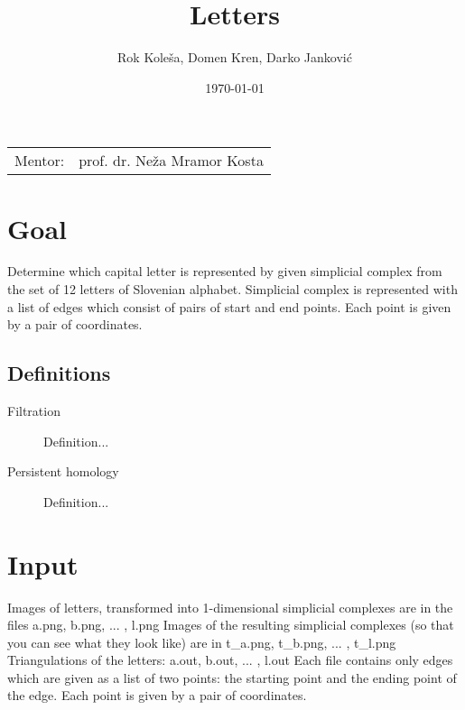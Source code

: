 \documentclass{article}
\title{Letters} %
\author{Rok Koleša, Domen Kren, Darko Janković} %
\date{\today} %
\begin{document}
\maketitle %

\begin{center}
\begin{tabular}{l r}
Mentor: & prof. dr. Neža Mramor Kosta %
\end{tabular}
\end{center}


\newpage
\tableofcontents
\newpage

\section{Goal}
  Determine which capital letter is represented by given simplicial complex from the set of 12 letters of Slovenian alphabet. Simplicial complex is represented with a list of edges which consist of pairs of start and end points. Each point is given by a pair of coordinates.


\subsection{Definitions}
\label{definicije}
\begin{description}
\item[Filtration]
Definition...
\item[Persistent homology]
Definition...
\end{description} 
 

\section{Input}
Images of letters, transformed into 1-dimensional simplicial complexes are in the files
a.png, b.png, ... , l.png
Images of the resulting simplicial complexes (so that you can see what they look like) are
in t\_a.png, t\_b.png, ... , t\_l.png
Triangulations of the letters: a.out, b.out, ... , l.out
Each file contains only edges which are given as a list of two points: the starting point
and the ending point of the edge. Each point is given by a pair of coordinates.
\end{document}
